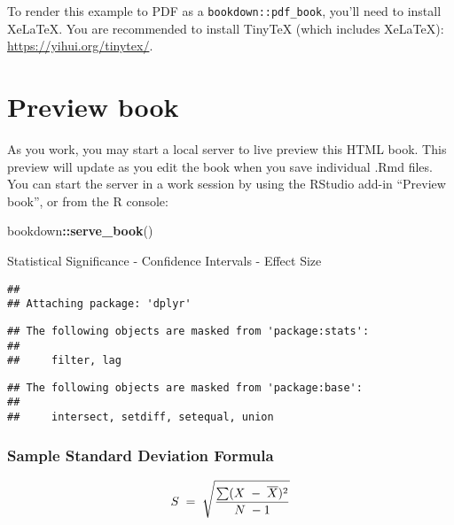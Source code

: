 \documentclass[
]{book}
\newenvironment{Shaded}{\begin{snugshade}}{\end{snugshade}}
\newcommand{\FunctionTok}[1]{\textcolor[rgb]{0.13,0.29,0.53}{\textbf{#1}}}
\newcommand{\NormalTok}[1]{#1}
\newcommand{\SpecialCharTok}[1]{\textcolor[rgb]{0.81,0.36,0.00}{\textbf{#1}}}
\theoremstyle{definition}
\theoremstyle{definition}
\theoremstyle{definition}
\theoremstyle{definition}
\theoremstyle{remark}
\begin{document}
To render this example to PDF as a \texttt{bookdown::pdf\_book}, you'll need to install XeLaTeX. You are recommended to install TinyTeX (which includes XeLaTeX): \url{https://yihui.org/tinytex/}.

\hypertarget{preview-book}{%
\section{Preview book}\label{preview-book}}

As you work, you may start a local server to live preview this HTML book. This preview will update as you edit the book when you save individual .Rmd files. You can start the server in a work session by using the RStudio add-in ``Preview book'', or from the R console:

\begin{Shaded}
\begin{Highlighting}[]
\NormalTok{bookdown}\SpecialCharTok{::}\FunctionTok{serve\_book}\NormalTok{()}
\end{Highlighting}
\end{Shaded}

Statistical Significance - Confidence Intervals - Effect Size

\begin{verbatim}
## 
## Attaching package: 'dplyr'
\end{verbatim}

\begin{verbatim}
## The following objects are masked from 'package:stats':
## 
##     filter, lag
\end{verbatim}

\begin{verbatim}
## The following objects are masked from 'package:base':
## 
##     intersect, setdiff, setequal, union
\end{verbatim}

\hypertarget{sample-standard-deviation-formula}{%
\subsubsection{Sample Standard Deviation Formula}\label{sample-standard-deviation-formula}}

\[\large
S\;=\;\sqrt{\frac{\sum(X\;-\;{\overline{X}})^2}{N\;-1}}
\]
\end{document}
